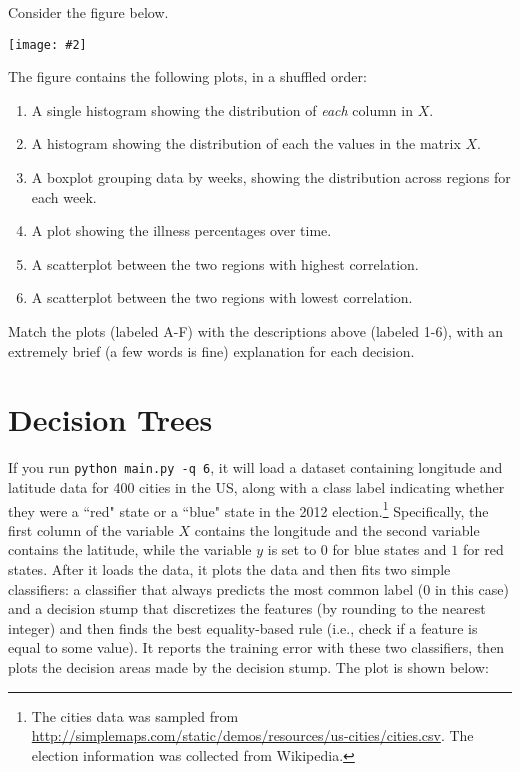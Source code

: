 \documentclass{article}
\def\blu#1{{\color{blu}#1}}
\newcommand{\fig}[2]{\texttt{[image: \#2]}}
\begin{document}
	Consider the figure below.

	\fig{1}{./figs/visualize-unlabeled}

	The figure contains the following plots, in a shuffled order:
	\begin{enumerate}
		\item A single histogram showing the distribution of \emph{each} column in $X$.
		\item A histogram showing the distribution of each the values in the matrix $X$.
		\item A boxplot grouping data by weeks, showing the distribution across regions for each week.
		\item A plot showing the illness percentages over time.
		\item A scatterplot between the two regions with highest correlation.
		\item A scatterplot between the two regions with lowest correlation.
	\end{enumerate}

	\blu{Match the plots (labeled A-F) with the descriptions above (labeled 1-6), with an extremely brief (a few words is fine) explanation for each decision.}




	\section{Decision Trees}

	If you run \texttt{python main.py -q 6}, it will load a dataset containing longitude
	and latitude data for 400 cities in the US, along with a class label indicating
	whether they were a ``red" state or a ``blue" state in the 2012
	election.\footnote{The cities data was sampled from \url{http://simplemaps.com/static/demos/resources/us-cities/cities.csv}. The election information was collected from Wikipedia.}
	Specifically, the first column of the variable $X$ contains the
	longitude and the second variable contains the latitude,
	while the variable $y$ is set to $0$ for blue states and $1$ for red states.
	After it loads the data, it plots the data and then fits two simple
	classifiers: a classifier that always predicts the
	most common label ($0$ in this case) and a decision stump
	that discretizes the features (by rounding to the nearest integer)
	and then finds the best equality-based rule (i.e., check
	if a feature is equal to some value).
	It reports the training error with these two classifiers, then plots the decision areas made by the decision stump.
	The plot is shown below:
\end{document}
